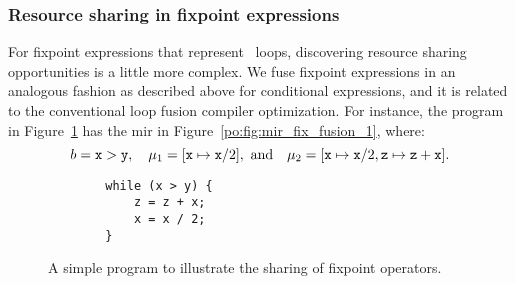 \subsubsection{Resource sharing in fixpoint expressions}

For fixpoint expressions that represent \whilelit~loops, discovering resource
sharing opportunities is a little more complex.  We fuse fixpoint expressions
in an analogous fashion as described above for conditional expressions, and
it is related to the conventional loop fusion compiler optimization.  For
instance, the program in Figure~\ref{po:lst:loop_example} has the \gls{mir}
in Figure~\ref{po:fig:mir_fix_fusion_1}, where:
\begin{equation}
    b = \texttt{x} > \texttt{y}, \quad
    \mu_1 = [\texttt{x} \mapsto \texttt{x} / 2], \text{~and} \quad
    \mu_2 = [\texttt{x} \mapsto \texttt{x} / 2, \texttt{z} \mapsto \texttt{z} + \texttt{x}].
\end{equation}
\begin{figure}[ht]
    \begin{lstlisting}
        while (x > y) {
            z = z + x;
            x = x / 2;
        }
    \end{lstlisting}
    \caption{%
        A simple program to illustrate the sharing of fixpoint operators.
    }\label{po:lst:loop_example}
\end{figure}

